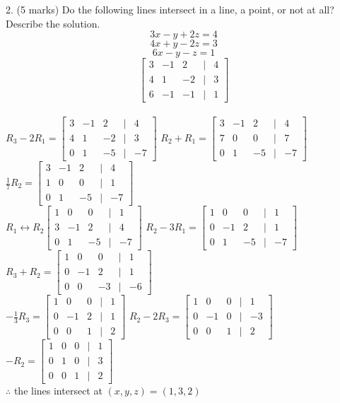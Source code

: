 \documentclass[a4paper]{article}
\begin{document}
2. (5 marks) Do the following lines intersect in a line, a point, or not at all? Describe the solution.\\
$$3x - y + 2z = 4$$
$$4x + y - 2z = 3$$
$$6x - y - z = 1$$
\[
\begin{bmatrix}
3&-1&2&|&4\\
4&1&-2&|&3\\
6&-1&-1&|&1
\end{bmatrix}
\]\\
$R_3-2R_1 = \begin{bmatrix}
3&-1&2&|&4\\
4&1&-2&|&3\\
0&1&-5&|&-7
\end{bmatrix}$ $R_2+R_1 = \begin{bmatrix}
3&-1&2&|&4\\
7&0&0&|&7\\
0&1&-5&|&-7
\end{bmatrix}$ $\frac{1}{7}R_2 = \begin{bmatrix}
3&-1&2&|&4\\
1&0&0&|&1\\
0&1&-5&|&-7
\end{bmatrix}$\\
$R_1\leftrightarrow R_2 \begin{bmatrix}
1&0&0&|&1\\
3&-1&2&|&4\\
0&1&-5&|&-7
\end{bmatrix}$ $R_2 - 3R_1 = \begin{bmatrix}
1&0&0&|&1\\
0&-1&2&|&1\\
0&1&-5&|&-7
\end{bmatrix}$ $R_3 + R_2 = \begin{bmatrix}
1&0&0&|&1\\
0&-1&2&|&1\\
0&0&-3&|&-6
\end{bmatrix}$\\
$-\frac{1}{3}R_3 = \begin{bmatrix}
1&0&0&|&1\\
0&-1&2&|&1\\
0&0&1&|&2
\end{bmatrix}$ $R_2 - 2R_3 = \begin{bmatrix}
1&0&0&|&1\\
0&-1&0&|&-3\\
0&0&1&|&2
\end{bmatrix}$ $-R_2 = \begin{bmatrix}
1&0&0&|&1\\
0&1&0&|&3\\
0&0&1&|&2
\end{bmatrix}$\\
$\therefore$ the lines intersect at $(x,y,z) = (1,3,2)$\\
\end{document}
